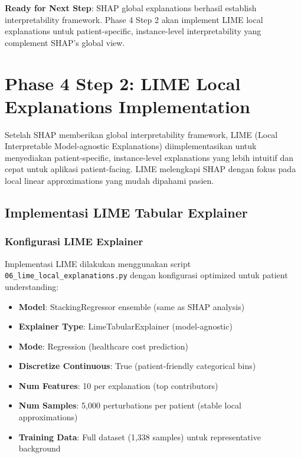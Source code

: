 \textbf{Ready for Next Step}: SHAP global explanations berhasil establish interpretability framework. Phase 4 Step 2 akan implement LIME local explanations untuk patient-specific, instance-level interpretability yang complement SHAP's global view.

\section{Phase 4 Step 2: LIME Local Explanations Implementation}
\label{sec:phase4-lime}

Setelah SHAP memberikan global interpretability framework, LIME (Local Interpretable Model-agnostic Explanations) diimplementasikan untuk menyediakan patient-specific, instance-level explanations yang lebih intuitif dan cepat untuk aplikasi patient-facing. LIME melengkapi SHAP dengan fokus pada local linear approximations yang mudah dipahami pasien.

\subsection{Implementasi LIME Tabular Explainer}
\label{subsec:lime-implementation}

\subsubsection{Konfigurasi LIME Explainer}

Implementasi LIME dilakukan menggunakan script \texttt{06\_lime\_local\_explanations.py} dengan konfigurasi optimized untuk patient understanding:

\begin{itemize}
    \item \textbf{Model}: StackingRegressor ensemble (same as SHAP analysis)
    \item \textbf{Explainer Type}: LimeTabularExplainer (model-agnostic)
    \item \textbf{Mode}: Regression (healthcare cost prediction)
    \item \textbf{Discretize Continuous}: True (patient-friendly categorical bins)
    \item \textbf{Num Features}: 10 per explanation (top contributors)
    \item \textbf{Num Samples}: 5,000 perturbations per patient (stable local approximations)
    \item \textbf{Training Data}: Full dataset (1,338 samples) untuk representative background
\end{itemize}

